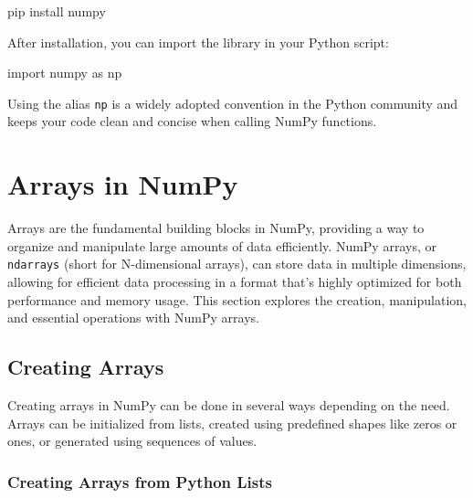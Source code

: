 \documentclass[
  letterpaper,
  DIV=11,
  numbers=noendperiod]{scrreprt}
\newenvironment{Shaded}{\begin{snugshade}}{\end{snugshade}}
\newcommand{\ExtensionTok}[1]{\textcolor[rgb]{0.00,0.23,0.31}{#1}}
\newcommand{\ImportTok}[1]{\textcolor[rgb]{0.00,0.46,0.62}{#1}}
\newcommand{\NormalTok}[1]{\textcolor[rgb]{0.00,0.23,0.31}{#1}}
\begin{document}
\begin{Shaded}
\begin{Highlighting}[]
\ExtensionTok{pip}\NormalTok{ install numpy}
\end{Highlighting}
\end{Shaded}

After installation, you can import the library in your Python script:

\begin{Shaded}
\begin{Highlighting}[]
\ImportTok{import}\NormalTok{ numpy }\ImportTok{as}\NormalTok{ np}
\end{Highlighting}
\end{Shaded}

Using the alias \texttt{np} is a widely adopted convention in the Python
community and keeps your code clean and concise when calling NumPy
functions.

\hypertarget{arrays-in-numpy}{%
\section{Arrays in NumPy}\label{arrays-in-numpy}}

Arrays are the fundamental building blocks in NumPy, providing a way to
organize and manipulate large amounts of data efficiently. NumPy arrays,
or \texttt{ndarrays} (short for N-dimensional arrays), can store data in
multiple dimensions, allowing for efficient data processing in a format
that's highly optimized for both performance and memory usage. This
section explores the creation, manipulation, and essential operations
with NumPy arrays.

\hypertarget{creating-arrays}{%
\subsection{Creating Arrays}\label{creating-arrays}}

Creating arrays in NumPy can be done in several ways depending on the
need. Arrays can be initialized from lists, created using predefined
shapes like zeros or ones, or generated using sequences of values.

\hypertarget{creating-arrays-from-python-lists}{%
\subsubsection{Creating Arrays from Python
Lists}\label{creating-arrays-from-python-lists}}
\end{document}
